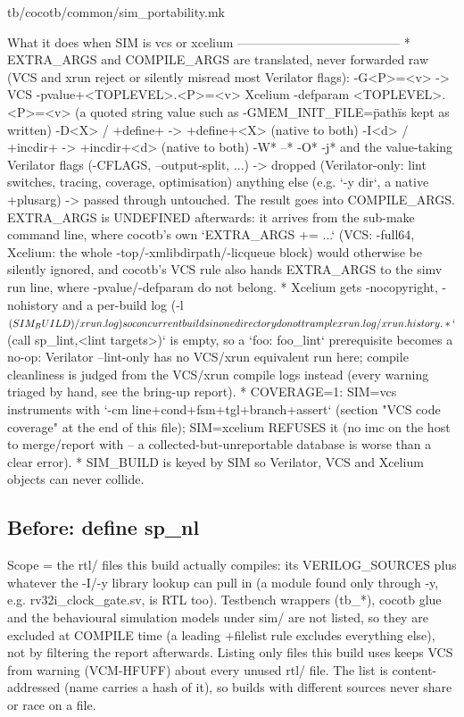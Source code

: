 \begin{relocated}{tb/cocotb/common/sim_portability.mk}
\begin{textblock}
What it does when SIM is vcs or xcelium
---------------------------------------
 * EXTRA_ARGS and COMPILE_ARGS are translated, never forwarded raw (VCS and xrun reject or silently
   misread most Verilator flags):
       -G<P>=<v>        -> VCS   -pvalue+<TOPLEVEL>.<P>=<v>      Xcelium  -defparam <TOPLEVEL>.<P>=<v>
                           (a quoted string value such as -GMEM_INIT_FILE=\"path\" is kept as written)
       -D<X> / +define+ -> +define+<X>                          (native to both)
       -I<d> / +incdir+ -> +incdir+<d>                          (native to both)
       -W*  --*  -O*  -j*  and the value-taking Verilator flags (-CFLAGS, --output-split, ...)
                        -> dropped (Verilator-only: lint switches, tracing, coverage, optimisation)
       anything else (e.g. `-y dir`, a native +plusarg) -> passed through untouched.
   The result goes into COMPILE_ARGS.  EXTRA_ARGS is UNDEFINED afterwards: it arrives from the sub-make
   command line, where cocotb's own `EXTRA_ARGS += ...` (VCS: -full64, Xcelium: the whole
   -top/-xmlibdirpath/-licqueue block) would otherwise be silently ignored, and cocotb's VCS rule
   also hands EXTRA_ARGS to the simv run line, where -pvalue/-defparam do not belong.
 * Xcelium gets -nocopyright, -nohistory and a per-build log (-l $(SIM_BUILD)/xrun.log) so concurrent
   builds in one directory do not trample xrun.log / xrun.history.
 * `$(call sp_lint,<lint targets>)` is empty, so a `foo: foo_lint` prerequisite becomes a no-op:
   Verilator --lint-only has no VCS/xrun equivalent run here; compile cleanliness is judged from the
   VCS/xrun compile logs instead (every warning triaged by hand, see the bring-up report).
 * COVERAGE=1: SIM=vcs instruments with `-cm line+cond+fsm+tgl+branch+assert` (section "VCS code
   coverage" at the end of this file); SIM=xcelium REFUSES it (no imc on the host to merge/report
   with -- a collected-but-unreportable database is worse than a clear error).
 * SIM_BUILD is keyed by SIM so Verilator, VCS and Xcelium objects can never collide.
\end{textblock}

\subsection*{Before: define sp\_nl}

\begin{textblock}
Scope = the rtl/ files this build actually compiles: its VERILOG_SOURCES plus whatever the -I/-y
library lookup can pull in (a module found only through -y, e.g. rv32i_clock_gate.sv, is RTL too).
Testbench wrappers (tb_*), cocotb glue and the behavioural simulation models under sim/ are not
listed, so they are excluded at COMPILE time (a leading +filelist rule excludes everything else),
not by filtering the report afterwards.  Listing only files this build uses keeps VCS from warning
(VCM-HFUFF) about every unused rtl/ file.  The list is content-addressed (name carries a hash of
it), so builds with different sources never share or race on a file.
\end{textblock}


\end{relocated}
